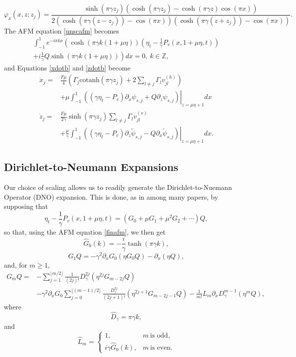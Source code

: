 \documentclass[a4paper,11pt]{article}
\newcommand{\ba}{\begin{array}}
\newcommand{\ea}{\end{array}}
\newcommand{\p}{\partial}
\begin{document}
\[
\varphi_{x}(x,z;z_{j}) = \frac{\sinh(\pi \gamma z_{j})\left(\cosh(\pi \gamma z_{j})-\cosh(\pi \gamma z)\cos(\pi x)\right)}{2\left(\cosh(\pi\gamma(z-z_{j}))-\cos(\pi x)\right) \left(\cosh(\pi\gamma(z+z_{j}))-\cos(\pi x)\right)}.
\]
The AFM equation \eqref{unscafm} becomes  
\begin{align}
\int_{-1}^{1} e^{-i\pi k x}\left(\cosh\left( \pi\gamma k (1 + \mu \eta)\right)\left(\eta_{t} - \frac{1}{\gamma}P_{v}(x,1+\mu\eta,t) \right) \right.\nonumber\\
\left.+i  \frac{1}{\gamma}Q\sinh\left(\pi \gamma k (1 + \mu \eta)\right)\right) dx = 0,~k\in\mathbb{Z},\label{finafm}
\end{align}
and Equations \eqref{xdotb} and \eqref{zdotb} become
\begin{align*}
\dot{x}_{j} = &\frac{F\mu}{4}\left(\Gamma_{j}\mbox{cotanh}\left(\pi \gamma z_{j} \right)+2\sum_{l\neq j}\Gamma_{l}v_{jl}^{(h)} \right)\\
&  +\mu\int_{-1}^{1}\left.\left( \left(\gamma \eta_{t}-P_{v} \right)\p_{x}\psi_{s,j} +  Q \p_{z}\psi_{s,j} \right)\right|_{z=\mu\eta + 1} dx\\
\dot{z}_{j} = & \frac{F\mu}{2\gamma}\sinh\left( \pi \gamma z_{j}\right)\sum_{l\neq j} \Gamma_{l} v_{jl}^{(v)}\\
&  +  \frac{\mu}{\gamma }\int_{-1}^{1}\left.\left( \left(\gamma \eta_{t}-P_{v}\right)\p_{z}\tilde{\psi}_{s,j} - Q \p_{x}\tilde{\psi}_{s,j} \right)\right|_{z= \mu \eta + 1} dx.
\end{align*}
\subsection{Dirichlet-to-Neumann Expansions}
Our choice of scaling allows us to readily generate the Dirichlet-to-Nuemann Operator (DNO) expansion.  This is done, as in \cite{craig} among many papers, by supposing that 
\[
\eta_{t} - \frac{1}{\gamma}P_{v}(x,1+\mu \eta,t) = \left(G_{0} + \mu G_{1} + \mu^{2}  G_{2} + \cdots \right)Q, 
\]
so that, using the AFM equation \eqref{finafm}, we then get 
\[
\hat{G}_{0}(k) = -\frac{i}{\gamma}\tanh(\pi \gamma k),
\]
\[
G_{1}Q = -\gamma^{2}\p_{x}G_{0}(\eta G_{0}Q) - \p_{x}(\eta Q),
\]
and, for $m\geq 1$, 
\begin{align*}
G_{m}Q = & -\sum_{j=1}^{\lfloor{m/2}\rfloor}\frac{1}{(2j)!}D^{2j}_{\gamma}\left(\eta^{2j}G_{m-2j}Q\right) \\
& - \gamma^{2}\p_{x}G_{0} \sum_{j=0}^{\lfloor{(m-1)/2}\rfloor}\frac{D_{\gamma}^{2j}}{(2j+1)!}\left(\eta^{2j+1}G_{m-2j-1}Q\right) - \frac{1}{m!}L_{m} \p_{x}D_{\gamma}^{m-1}\left(\eta^{m}Q \right),
\end{align*}
where
\[
\hat{D}_{\gamma} = \pi \gamma k,
\]
and
\[
\hat{L}_{m} = \left\{
\ba{rl}
1,  & m~\mbox{is odd}, \\
i\gamma \hat{G}_{0}(k),  & m~\mbox{is even}.
\ea
\right.
\]
\end{document}
